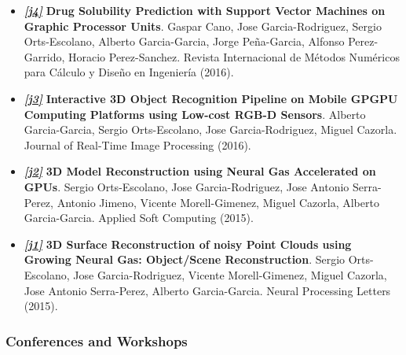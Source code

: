 \documentclass[8pt]{article}
\begin{document}
\begin{itemize}
    \item \emph{\textbf{\href{http://www.sciencedirect.com/science/article/pii/S0213131516000067}{[j4]}}} \textbf{Drug Solubility Prediction with Support Vector Machines on Graphic Processor Units}. Gaspar Cano, Jose Garcia-Rodriguez, Sergio Orts-Escolano, Alberto Garcia-Garcia, Jorge Peña-Garcia, Alfonso Perez-Garrido, Horacio Perez-Sanchez. Revista Internacional de Métodos Numéricos para Cálculo y Diseño en Ingeniería (2016).
    \item \emph{\textbf{\href{http://link.springer.com/article/10.1007/s11554-016-0607-x}{[j3]}}} \textbf{Interactive 3D Object Recognition Pipeline on Mobile GPGPU Computing Platforms using Low-cost RGB-D Sensors}. Alberto Garcia-Garcia, Sergio Orts-Escolano, Jose Garcia-Rodriguez, Miguel Cazorla. Journal of Real-Time Image Processing (2016).
    \item \emph{\textbf{\href{http://www.sciencedirect.com/science/article/pii/S1568494615002008}{[j2]}}} \textbf{3D Model Reconstruction using Neural Gas Accelerated on GPUs}. Sergio Orts-Escolano, Jose Garcia-Rodriguez, Jose Antonio Serra-Perez, Antonio Jimeno, Vicente Morell-Gimenez, Miguel Cazorla, Alberto Garcia-Garcia. Applied Soft Computing (2015).
    \item \emph{\textbf{\href{http://link.springer.com/article/10.1007/s11063-015-9421-x}{[j1]}}} \textbf{3D Surface Reconstruction of noisy Point Clouds using Growing Neural Gas: Object/Scene Reconstruction}. Sergio Orts-Escolano, Jose Garcia-Rodriguez, Vicente Morell-Gimenez, Miguel Cazorla, Jose Antonio Serra-Perez, Alberto Garcia-Garcia. Neural Processing Letters (2015).
\end{itemize}

\subsubsection*{Conferences and Workshops}
\end{document}
